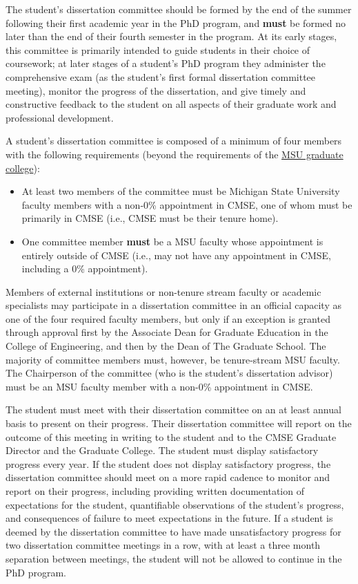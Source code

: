The student's dissertation committee should be formed by the end of the
summer following their first academic year in the PhD program, and
\textbf{must} be formed no later than the end of their fourth semester
in the program. At its early stages, this committee is primarily
intended to guide students in their choice of coursework; at later
stages of a student's PhD program they administer the comprehensive
exam (as the student's first formal dissertation committee meeting), 
monitor the progress of the dissertation, and give timely and
constructive feedback to the student on all aspects of their graduate
work and professional development.

A student's dissertation committee is composed of a minimum of four
members with the following requirements (beyond the requirements of
the \href{https://hr.msu.edu/documents/facacadhandbooks/facultyhandbook/composition.htm}{MSU graduate
college}):

\begin{itemize}
\item At least two members of the committee must be Michigan State
  University faculty members with a non-0\% appointment in CMSE, one
  of whom must be primarily in CMSE (i.e., CMSE must be their tenure
  home).

\item One committee member \textbf{must} be a MSU faculty whose appointment
  is entirely outside of CMSE (i.e., may not have any appointment in
  CMSE, including a 0\% appointment).

\end{itemize}

Members of external institutions or non-tenure stream faculty or
academic specialists may participate in a dissertation committee in an
official capacity as one of the four required faculty members, but
only if an exception is granted through approval first by the
Associate Dean for Graduate Education in the College of Engineering,
and then by the Dean of The Graduate School.  The majority of
committee members must, however, be tenure-stream MSU faculty.  The
Chairperson of the committee (who is the student's dissertation
advisor) must be an MSU faculty member with a non-0\% appointment in
CMSE.

The student must meet with their dissertation committee on an at least
annual basis to present on their progress.  Their dissertation
committee will report on the outcome of this meeting in writing to the
student and to the CMSE Graduate Director and the Graduate College.
The student must display satisfactory progress every year.  If the
student does not display satisfactory progress, the dissertation
committee should meet on a more rapid cadence to monitor and report on
their progress, including providing written documentation of
expectations for the student, quantifiable observations of the
student's progress, and consequences of failure to meet expectations
in the future.  If a student is deemed by the dissertation committee
to have made unsatisfactory progress for two dissertation committee
meetings in a row, with at least a three month separation between
meetings, the student will not be allowed to continue in the PhD
program.

